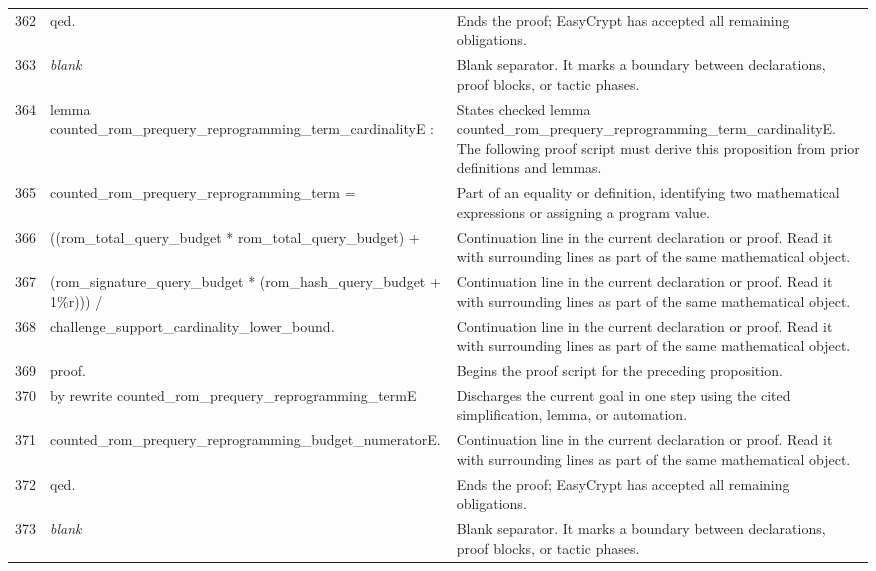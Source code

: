 \documentclass[10pt]{article}
\begin{document}
\begin{longtable}{r L{0.53\textwidth} L{0.37\textwidth}}
362 & {\ttfamily\scriptsize qed.} & Ends the proof; EasyCrypt has accepted all remaining obligations. \\
363 & {\ttfamily\scriptsize \emph{blank}} & Blank separator.  It marks a boundary between declarations, proof blocks, or tactic phases. \\
364 & {\ttfamily\scriptsize lemma counted\_rom\_prequery\_reprogramming\_term\_cardinalityE :} & States checked lemma counted\_rom\_prequery\_reprogramming\_term\_cardinalityE.  The following proof script must derive this proposition from prior definitions and lemmas. \\
365 & {\ttfamily\scriptsize   counted\_rom\_prequery\_reprogramming\_term =} & Part of an equality or definition, identifying two mathematical expressions or assigning a program value. \\
366 & {\ttfamily\scriptsize     ((rom\_total\_query\_budget * rom\_total\_query\_budget) +} & Continuation line in the current declaration or proof.  Read it with surrounding lines as part of the same mathematical object. \\
367 & {\ttfamily\scriptsize      (rom\_signature\_query\_budget * (rom\_hash\_query\_budget + 1\%r))) /} & Continuation line in the current declaration or proof.  Read it with surrounding lines as part of the same mathematical object. \\
368 & {\ttfamily\scriptsize     challenge\_support\_cardinality\_lower\_bound.} & Continuation line in the current declaration or proof.  Read it with surrounding lines as part of the same mathematical object. \\
369 & {\ttfamily\scriptsize proof.} & Begins the proof script for the preceding proposition. \\
370 & {\ttfamily\scriptsize by rewrite counted\_rom\_prequery\_reprogramming\_termE} & Discharges the current goal in one step using the cited simplification, lemma, or automation. \\
371 & {\ttfamily\scriptsize            counted\_rom\_prequery\_reprogramming\_budget\_numeratorE.} & Continuation line in the current declaration or proof.  Read it with surrounding lines as part of the same mathematical object. \\
372 & {\ttfamily\scriptsize qed.} & Ends the proof; EasyCrypt has accepted all remaining obligations. \\
373 & {\ttfamily\scriptsize \emph{blank}} & Blank separator.  It marks a boundary between declarations, proof blocks, or tactic phases. \\

\end{longtable}
\end{document}
